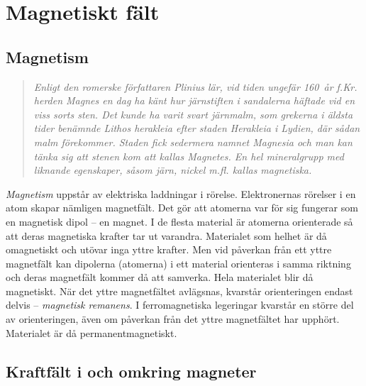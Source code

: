 \newpage
\section{Magnetiskt fält}
\label{elektromagnetiskafält}

\subsection{Magnetism}

\begin{quote}
\emph{Enligt den romerske författaren \emph{Plinius} lär, vid tiden ungefär
160~år f.Kr. herden \emph{Magnes} en dag ha känt hur järnstiften i
sandalerna häftade vid en viss sorts sten.
Det kunde ha varit svart järnmalm, som grekerna i äldsta tider benämnde
\emph{Lithos herakleia} efter staden \emph{Herakleia} i Lydien,
där sådan malm förekommer.
Staden fick sedermera namnet \emph{Magnesia} och man kan tänka sig att stenen
kom att kallas \emph{Magnetes}.
En hel mineralgrupp med liknande egenskaper, såsom järn, nickel m.fl. kallas
magnetiska.}
\end{quote}

\emph{Magnetism} uppstår av elektriska laddningar i rörelse.
Elektronernas rörelser i en atom skapar nämligen magnetfält.
Det gör att atomerna var för sig fungerar som en magnetisk dipol -- en magnet.
I de flesta material är atomerna orienterade så att deras magnetiska krafter
tar ut varandra.
Materialet som helhet är då omagnetiskt och utövar inga yttre krafter.
Men vid påverkan från ett yttre magnetfält kan dipolerna (atomerna) i ett
material orienteras i samma riktning och deras magnetfält kommer då att
samverka. Hela materialet blir då magnetiskt.
När det yttre magnetfältet avlägsnas, kvarstår orienteringen endast delvis --
\emph{magnetisk remanens}.
I ferromagnetiska legeringar kvarstår en större del av orienteringen, även om
påverkan från det yttre magnetfältet har upphört.
Materialet är då permanentmagnetiskt.


\newpage
\subsection{Kraftfält i och omkring magneter}

